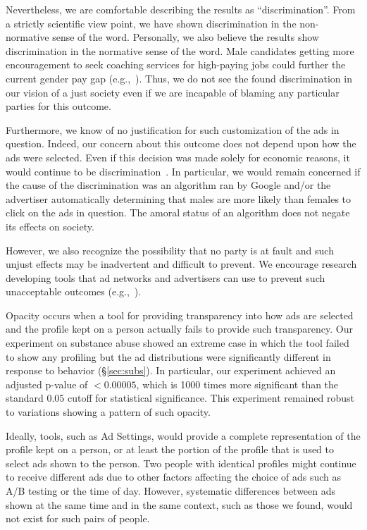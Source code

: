 \documentclass{article}
\begin{document}
Nevertheless, we are comfortable describing the results as ``discrimination''.  From a strictly scientific view point, we have shown discrimination in the non-normative sense of the word.  Personally, we also believe the results show discrimination in the normative sense of the word.
Male candidates getting more encouragement to seek coaching services for high-paying jobs could further the current gender pay gap (e.g.,~\cite{pew13pay}).
Thus, we do not see the found discrimination in our vision of a just society even if we are incapable of blaming any particular parties for this outcome.

Furthermore, we know of no justification for such customization of the ads in question.
Indeed, our concern about this outcome does not depend upon how the ads were selected.
Even if this decision was made solely for economic reasons, it would continue to be discrimination~\cite{zarsky14lawreview}.
In particular, we would remain concerned if the cause of the discrimination was an algorithm ran by Google and/or the advertiser automatically determining that males are more likely than females to click on the ads in question.
The amoral status of an algorithm does not negate its effects on society.

However, we also recognize the possibility that no party is at fault and such unjust effects may be inadvertent and difficult to prevent.
We encourage research developing tools that ad networks and advertisers can use to prevent such unacceptable outcomes (e.g.,~\cite{zemel13jmlr}).










Opacity occurs when a tool for providing transparency into how ads are selected and the profile kept on a person actually fails to provide such transparency.  Our experiment on substance abuse showed an extreme case in which the tool failed to show any profiling but the ad distributions were significantly different in response to behavior (\S\ref{sec:subs}).
In particular, our experiment achieved an adjusted p-value of $< 0.00005$, which is 1000 times more significant than the standard $0.05$ cutoff for statistical significance.
This experiment remained robust to variations showing a pattern of such opacity.

Ideally, tools, such as Ad Settings, would provide a complete representation of the profile kept on a person, or at least the portion of the profile that is used to select ads shown to the person.  Two people with identical profiles might continue to receive different ads due to other factors affecting the choice of ads such as A/B testing or the time of day.  However, systematic differences between ads shown at the same time and in the same context, such as those we found, would not exist for such pairs of people.
\end{document}
